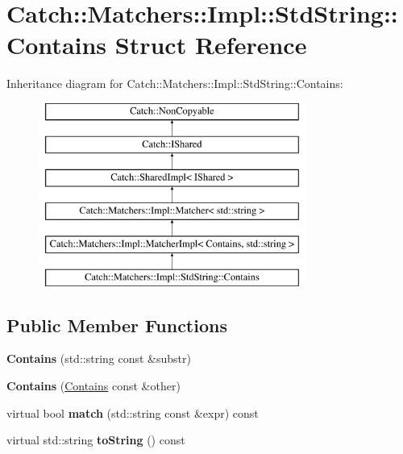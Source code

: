 \hypertarget{struct_catch_1_1_matchers_1_1_impl_1_1_std_string_1_1_contains}{\section{Catch\-:\-:Matchers\-:\-:Impl\-:\-:Std\-String\-:\-:Contains Struct Reference}
\label{struct_catch_1_1_matchers_1_1_impl_1_1_std_string_1_1_contains}
}
Inheritance diagram for Catch\-:\-:Matchers\-:\-:Impl\-:\-:Std\-String\-:\-:Contains\-:\begin{figure}[H]
\begin{center}
\leavevmode
\includegraphics[height=6.000000cm]{struct_catch_1_1_matchers_1_1_impl_1_1_std_string_1_1_contains}
\end{center}
\end{figure}
\subsection*{Public Member Functions}
\begin{DoxyCompactItemize}
\item 
\hypertarget{struct_catch_1_1_matchers_1_1_impl_1_1_std_string_1_1_contains_ac6f13133724bfd5796e8ee4ea8f2c0e3}{{\bfseries Contains} (std\-::string const \&substr)}\label{struct_catch_1_1_matchers_1_1_impl_1_1_std_string_1_1_contains_ac6f13133724bfd5796e8ee4ea8f2c0e3}

\item 
\hypertarget{struct_catch_1_1_matchers_1_1_impl_1_1_std_string_1_1_contains_ad6b1ef653dfcb3bab43c43be043dc4e8}{{\bfseries Contains} (\hyperlink{struct_catch_1_1_matchers_1_1_impl_1_1_std_string_1_1_contains}{Contains} const \&other)}\label{struct_catch_1_1_matchers_1_1_impl_1_1_std_string_1_1_contains_ad6b1ef653dfcb3bab43c43be043dc4e8}

\item 
\hypertarget{struct_catch_1_1_matchers_1_1_impl_1_1_std_string_1_1_contains_aa27d823dea5770025a24424fc3355a6f}{virtual bool {\bfseries match} (std\-::string const \&expr) const }\label{struct_catch_1_1_matchers_1_1_impl_1_1_std_string_1_1_contains_aa27d823dea5770025a24424fc3355a6f}

\item 
\hypertarget{struct_catch_1_1_matchers_1_1_impl_1_1_std_string_1_1_contains_a226755351f3598179925f3ab89d6def7}{virtual std\-::string {\bfseries to\-String} () const }\label{struct_catch_1_1_matchers_1_1_impl_1_1_std_string_1_1_contains_a226755351f3598179925f3ab89d6def7}

\end{DoxyCompactItemize}

